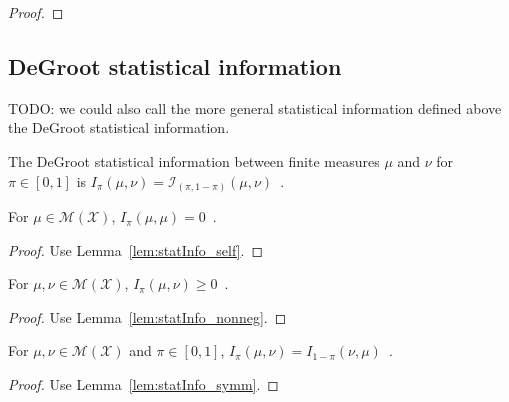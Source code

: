 \begin{proof}%
{}

\end{proof}



\subsection{DeGroot statistical information}

TODO: we could also call the more general statistical information defined above the DeGroot statistical information.

\begin{definition}
  \label{def:deGrootInfo}
  \leanok
  The DeGroot statistical information between finite measures $\mu$ and $\nu$ for $\pi \in [0,1]$ is $I_\pi(\mu, \nu) = \mathcal I_{(\pi, 1 - \pi)}(\mu, \nu)$~.
\end{definition}

\begin{lemma}
  \label{lem:deGrootInfo_self}
  \leanok
  For $\mu \in \mathcal M(\mathcal X)$, $I_\pi(\mu, \mu) = 0$~.
\end{lemma}

\begin{proof}%
{}
Use Lemma~\ref{lem:statInfo_self}.
\end{proof}

\begin{lemma}
  \label{lem:deGrootInfo_nonneg}
  For $\mu, \nu \in \mathcal M(\mathcal X)$, $I_\pi(\mu, \nu) \ge 0$~.
\end{lemma}

\begin{proof}%
{}
Use Lemma~\ref{lem:statInfo_nonneg}.
\end{proof}

\begin{lemma}
  \label{lem:deGrootInfo_symm}
  For $\mu, \nu \in \mathcal M(\mathcal X)$ and $\pi \in [0,1]$, $I_\pi(\mu, \nu) = I_{1 - \pi}(\nu, \mu)$~.
\end{lemma}

\begin{proof}%
{}
Use Lemma~\ref{lem:statInfo_symm}.
\end{proof}

